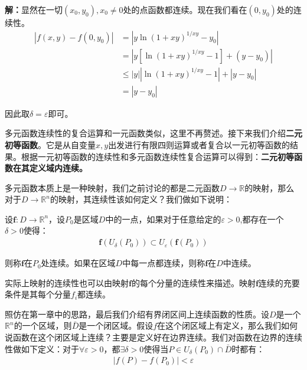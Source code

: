 \documentclass{ctexart}
\let\oldtextbf\textbf %
\renewcommand{\textbf}[1]{\textcolor{btex}{\oldtextbf{#1}}} %
\begin{document}
\textbf{解：}显然在一切$(x_0,y_0),x_0\neq 0$处的点函数都连续。现在我们看在$(0,y_0)$处的连续性。
\begin{align*}
    |f(x,y)-f(0,y_0)|&=|y\ln(1+xy)^{1/xy}-y_0|\\
    &=|y[\ln (1+xy)^{1/xy}-1]+(y-y_0)|\\
    &\leq |y||\ln(1+xy)^{1/xy}-1|+|y-y_0|\\
    &=|y-y_0|
\end{align*}

因此取$\delta=\varepsilon$即可。

多元函数连续性的复合运算和一元函数类似，这里不再赘述。接下来我们介绍\textbf{二元初等函数}。它是从自变量$x,y$出发进行有限四则运算或者复合以一元初等函数的结果。根据一元初等函数的连续性和多元函数连续性复合运算可以得到：\textbf{二元初等函数在其定义域内连续。}

多元函数本质上是一种映射，我们之前讨论的都是二元函数$D\to\mathbb{R}$的映射，那么对于$D\to\mathbb{R}^n$的映射，其连续性该如何定义？我们做如下说明：

\begin{tcolorbox}[
    colback=bac2,     %
    colframe=fra2,   %
    coltitle=white,             %
    coltext=tex2,
    title=映射的连续性,
    fonttitle=\bfseries,        %
arc=3mm,                     %
breakable
]
设$\bm{f}:D\to\mathbb{R}^n$，设$P_0$是区域$D$中的一点，如果对于任意给定的$\varepsilon>0$,都存在一个$\delta>0$使得：
\begin{align*}
    \bm{f}(U_\delta(P_0))\subset U_\varepsilon(\bm{f}(P_0))
\end{align*}

则称$\bm{f}$在$P_0$处连续。如果在区域$D$中每一点都连续，则称$\bm{f}$在$D$中连续。
\end{tcolorbox}

实际上映射的连续性也可以由映射$\bm{f}$的每个分量的连续性来描述。映射$\bm{f}$连续的充要条件是其每个分量$f_i$都连续。

照仿在第一章中的思路，最后我们介绍有界闭区间上连续函数的性质。设$D$是一个$\mathbb{R}^n$的一个区域，则$\bar{D}$是一个闭区域。假设$f$在这个闭区域上有定义，那么我们如何说函数在这个闭区域上连续？主要是定义好在边界连续。我们对函数在边界的连续性做如下定义：对于$\forall \varepsilon>0$，都$\exists\delta>0$使得当$P\in U_{\delta}(P_0)\cap\bar{D}$时都有：
\begin{align*}
    |f(P)-f(P_0)|<\varepsilon
\end{align*}
\end{document}
